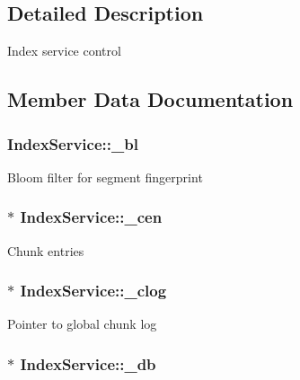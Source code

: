 \subsection{\-Detailed \-Description}
\-Index service control 

\subsection{\-Member \-Data \-Documentation}
\hypertarget{structIndexService_adc8c1659c9d847b57fac8b834a31915a}{
\subsubsection[{\-\_\-bl}]{ {\bf \-Index\-Service\-::\-\_\-bl}}}\label{structIndexService_adc8c1659c9d847b57fac8b834a31915a}
\-Bloom filter for segment fingerprint \hypertarget{structIndexService_aa6e028a46d131cb5861f25ef2584cb22}{
\subsubsection[{\-\_\-cen}]{$\ast$ {\bf \-Index\-Service\-::\-\_\-cen}}}\label{structIndexService_aa6e028a46d131cb5861f25ef2584cb22}
\-Chunk entries \hypertarget{structIndexService_ad0e9843f1aefc56211b9f363d8d25f28}{
\subsubsection[{\-\_\-clog}]{$\ast$ {\bf \-Index\-Service\-::\-\_\-clog}}}\label{structIndexService_ad0e9843f1aefc56211b9f363d8d25f28}
\-Pointer to global chunk log \hypertarget{structIndexService_a125e1109c0aa6005fe475e1c13f66fa3}{
\subsubsection[{\-\_\-db}]{$\ast$ {\bf \-Index\-Service\-::\-\_\-db}}}\label{structIndexService_a125e1109c0aa6005fe475e1c13f66fa3}
